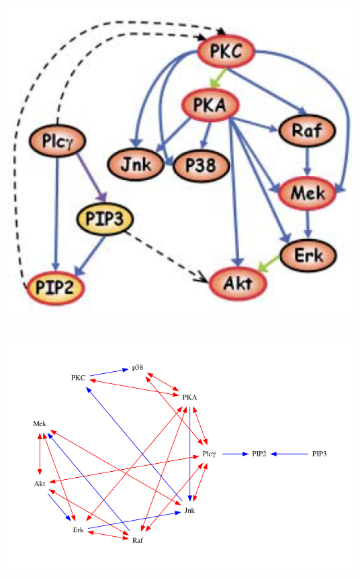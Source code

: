 \documentclass[letterpaper, 11pt]{article}
\begin{document}
\begin{figure}
	\centering
	\begin{subfigure}{.5\textwidth}
		\centering
		\includegraphics[width=.6\linewidth]{sachs_network}
		\vspace{3em}
		\caption{}
		\label{fig:prob6a}
	\end{subfigure}%
	\begin{subfigure}{.5\textwidth}
		\centering
		\includegraphics[width=1\linewidth]{sachs_admg}
		\caption{}
		\label{fig:prob6b}
	\end{subfigure}
	\caption{}
	\label{fig:prob6}
\end{figure}

\vspace{1em}
\end{document}
